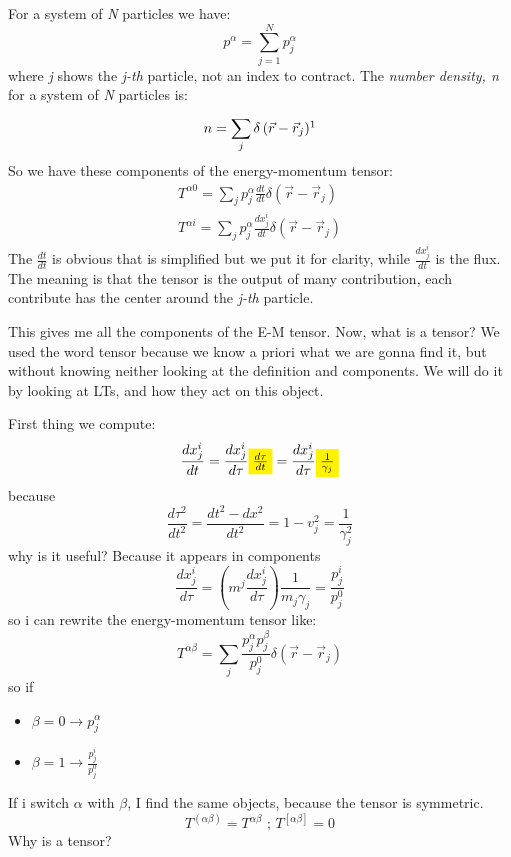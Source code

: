 For a system of \emph{N} particles we have: 
\[
p^{\alpha } = \sum_{j=1}^{N}{p^{\alpha }_{j}}	 
\]
where \emph{j} shows the \emph{j-th} particle, not an index to contract.
The \emph{number density, n} for a system of \emph{N} particles is:
\[
n = \sum_{j}^{}{\delta\left( \vec{r}-\vec{r}_{j} \right)}\footnotemark
\]
So we have these components of the energy-momentum tensor:
\begin{gather*}
T^{\alpha 0} = \sum_{j}^{}{p^{\alpha }_{j} \frac{dt}{dt} \delta\left( \vec{r}-\vec{r}_{j} \right)} \\
T^{\alpha i} = \sum_{j}^{}{p^{\alpha }_{j} \frac{dx^{i}_{j}}{dt} \delta\left( \vec{r}-\vec{r}_{j} \right) }
\end{gather*}
The $\frac{dt}{dt}$ is obvious that is simplified but we put it for clarity, while $ \frac{dx^{i}_{j}}{dt} $ is the flux.
The meaning is that the tensor is the output of many contribution, each contribute has the center around the \emph{j-th} particle.

This gives me all the components of the E-M tensor. Now, what is a tensor? We used the word tensor because we know a priori what we are gonna find it, but without knowing neither looking at the definition and components. We will do it by looking at LTs, and how they act on this object.

First thing we compute:
\[
\frac{ dx^{i}_{j}}{dt} = \frac{ dx^{i}_{j}}{d\tau } \colorbox{yellow}{$ \frac{d\tau }{dt}$} = \frac{dx^{i}_{j}}{d\tau } \colorbox{yellow}{$ \frac{1}{\gamma_{j}}$}
\]
because
\[
\frac{d\tau ^{2}}{dt^{2}} = \frac{dt^{2}-dx^{2}}{dt^{2}} = 1 - v^{2}_{j} = \frac{1}{\gamma^{2}_{j}}
\]
why is it useful? Because it appears in components
\[
\frac{dx^{i}_{j}}{d\tau } = \left( m^{j} \frac{dx^{i}_{j}}{d\tau } \right) \frac{1}{m_{j}\gamma_{j}} = \frac{p^{i}_{j}}{p^{0}_{j}}		
\]
so i can rewrite the energy-momentum tensor like:
\[
T^{\alpha \beta } = \sum_{j}^{}{\frac{ p^{\alpha }_{j}p^{\beta }_{j}}{p^{0}_{j}}\delta\left( \vec{r}-\vec{r}_{j} \right)}
\]
so if 
\begin{itemize}
	\item $\beta =0 \to p^{\alpha }_{j}$ 
	\item $\beta =1 \to \frac{p^{i}_{j}}{p^{0}_{j}}$
\end{itemize}
If i switch $\alpha $ with $\beta $, I find the same objects, because the tensor is symmetric.
\[
	T^{\left( \alpha \beta  \right)} = T^{\alpha \beta } \text{  ;   } T^{[\alpha \beta ]} = 0
\]
Why is a tensor? 

